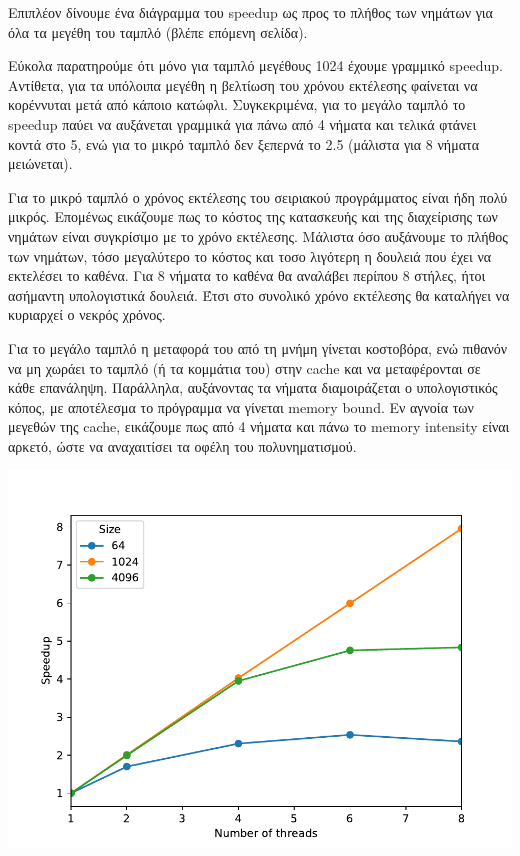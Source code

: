 \documentclass[12pt,titlepage]{article}
\begin{document}
Επιπλέον δίνουμε ένα διάγραμμα του speedup ως προς το πλήθος των νημάτων για όλα
τα μεγέθη του ταμπλό (βλέπε επόμενη σελίδα).

Εύκολα παρατηρούμε ότι μόνο για ταμπλό μεγέθους 1024 έχουμε γραμμικό speedup.
Αντίθετα, για τα υπόλοιπα μεγέθη η βελτίωση του χρόνου εκτέλεσης φαίνεται να
κορέννυται μετά από κάποιο κατώφλι. Συγκεκριμένα, για το μεγάλο ταμπλό το
speedup παύει να αυξάνεται γραμμικά για πάνω από 4 νήματα και τελικά φτάνει
κοντά στο 5, ενώ για το μικρό ταμπλό δεν ξεπερνά το 2.5 (μάλιστα για 8 νήματα
μειώνεται).

Για το μικρό ταμπλό ο χρόνος εκτέλεσης του σειριακού προγράμματος είναι ήδη πολύ
μικρός. Επομένως εικάζουμε πως το κόστος της κατασκευής και της διαχείρισης των
νημάτων είναι συγκρίσιμο με το χρόνο εκτέλεσης. Μάλιστα όσο αυξάνουμε το πλήθος
των νημάτων, τόσο μεγαλύτερο το κόστος και τοσο λιγότερη η δουλειά που έχει να
εκτελέσει το καθένα. Για 8 νήματα το καθένα θα αναλάβει περίπου 8 στήλες, ήτοι
ασήμαντη υπολογιστικά δουλειά. Έτσι στο συνολικό χρόνο εκτέλεσης θα καταλήγει να
κυριαρχεί ο νεκρός χρόνος.

Για το μεγάλο ταμπλό η μεταφορά του από τη μνήμη γίνεται κοστοβόρα, ενώ πιθανόν
να μη χωράει το ταμπλό (ή τα κομμάτια του) στην cache και να μεταφέρονται σε
κάθε επανάληψη. Παράλληλα, αυξάνοντας τα νήματα διαμοιράζεται ο υπολογιστικός
κόπος, με αποτέλεσμα το πρόγραμμα να γίνεται memory bound. Εν αγνοία των μεγεθών
της cache, εικάζουμε πως από 4 νήματα και πάνω το memory intensity είναι αρκετό,
ώστε να αναχαιτίσει τα οφέλη του πολυνηματισμού.

\begin{center}
    \includegraphics[width=\textwidth]{ask1/speedup}
\end{center}
\end{document}
